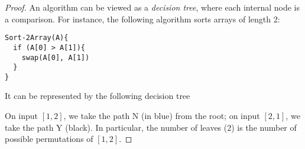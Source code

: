 \documentclass{report}
\begin{document}
\begin{proof}
An algorithm can be viewed as a \textit{decision tree}, where each
internal node is a comparison. For instance, the following algorithm
sorts arrays of length 2:

\begin{lstlisting}
Sort-2Array(A){
  if (A[0] > A[1]){
    swap(A[0], A[1])
  }
}
\end{lstlisting}
It can be represented by the following decision tree
\begin{center}
\end{center}
On input $[1,2]$, we take the path N (in blue) from the root; on input $[2,1]$,
we take the path Y (black). In particular, the number of leaves (2) is the number 
of possible permutations of $[1,2]$.


\end{proof}
\end{document}
